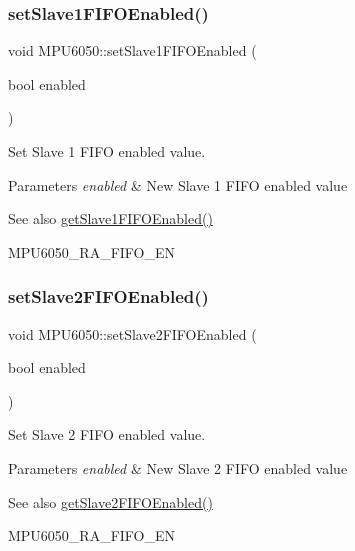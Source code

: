 \subsubsection{\texorpdfstring{setSlave1FIFOEnabled()}{setSlave1FIFOEnabled()}}
{\footnotesize\ttfamily void M\+P\+U6050\+::set\+Slave1\+F\+I\+F\+O\+Enabled (\begin{DoxyParamCaption}\item[{bool}]{enabled }\end{DoxyParamCaption})}

Set Slave 1 F\+I\+FO enabled value. 
\begin{DoxyParams}{Parameters}
{\em enabled} & New Slave 1 F\+I\+FO enabled value \\
\hline
\end{DoxyParams}
\begin{DoxySeeAlso}{See also}
\mbox{\hyperlink{class_m_p_u6050_afd6a9b55a589c83c9a0fb0b5b2a88234}{get\+Slave1\+F\+I\+F\+O\+Enabled()}} 

M\+P\+U6050\+\_\+\+R\+A\+\_\+\+F\+I\+F\+O\+\_\+\+EN 
\end{DoxySeeAlso}
\mbox{\label{class_m_p_u6050_a38a10ac4f30b96718ec021dc0db8587b}} 
\subsubsection{\texorpdfstring{setSlave2FIFOEnabled()}{setSlave2FIFOEnabled()}}
{\footnotesize\ttfamily void M\+P\+U6050\+::set\+Slave2\+F\+I\+F\+O\+Enabled (\begin{DoxyParamCaption}\item[{bool}]{enabled }\end{DoxyParamCaption})}

Set Slave 2 F\+I\+FO enabled value. 
\begin{DoxyParams}{Parameters}
{\em enabled} & New Slave 2 F\+I\+FO enabled value \\
\hline
\end{DoxyParams}
\begin{DoxySeeAlso}{See also}
\mbox{\hyperlink{class_m_p_u6050_a3c2e29508607a655221a2fa4f4219b4d}{get\+Slave2\+F\+I\+F\+O\+Enabled()}} 

M\+P\+U6050\+\_\+\+R\+A\+\_\+\+F\+I\+F\+O\+\_\+\+EN 
\end{DoxySeeAlso}
\mbox{\label{class_m_p_u6050_a6ed713870c7f6d085ded91a45515a36c}} 
